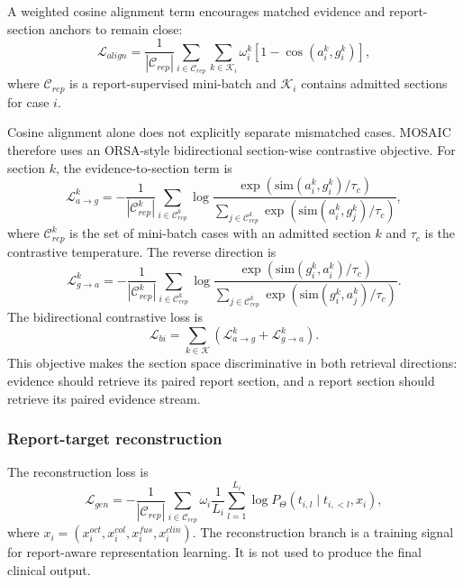 A weighted cosine alignment term encourages matched evidence and report-section anchors to remain close:
\begin{equation}
\mathcal{L}_{align}
=
\frac{1}{|\mathcal{C}_{rep}|}
\sum_{i\in\mathcal{C}_{rep}}
\sum_{k\in\mathcal{K}_i}
\omega_i^k
\left[1-\cos(a_i^k,g_i^k)\right],
\label{eq:mosaic_alignment_loss_final_topcs}
\end{equation}
where $\mathcal{C}_{rep}$ is a report-supervised mini-batch and $\mathcal{K}_i$ contains admitted sections for case $i$.

Cosine alignment alone does not explicitly separate mismatched cases. MOSAIC therefore uses an ORSA-style bidirectional section-wise contrastive objective. For section $k$, the evidence-to-section term is
\begin{equation}
\mathcal{L}_{a\rightarrow g}^{k}
=
-\frac{1}{|\mathcal{C}_{rep}^{k}|}
\sum_{i\in\mathcal{C}_{rep}^{k}}
\log
\frac{
\exp(\mathrm{sim}(a_i^k,g_i^k)/\tau_c)
}{
\sum_{j\in\mathcal{C}_{rep}^{k}}
\exp(\mathrm{sim}(a_i^k,g_j^k)/\tau_c)
},
\label{eq:mosaic_contrastive_ag_final_topcs}
\end{equation}
where $\mathcal{C}_{rep}^{k}$ is the set of mini-batch cases with an admitted section $k$ and $\tau_c$ is the contrastive temperature. The reverse direction is
\begin{equation}
\mathcal{L}_{g\rightarrow a}^{k}
=
-\frac{1}{|\mathcal{C}_{rep}^{k}|}
\sum_{i\in\mathcal{C}_{rep}^{k}}
\log
\frac{
\exp(\mathrm{sim}(g_i^k,a_i^k)/\tau_c)
}{
\sum_{j\in\mathcal{C}_{rep}^{k}}
\exp(\mathrm{sim}(g_i^k,a_j^k)/\tau_c)
}.
\label{eq:mosaic_contrastive_ga_final_topcs}
\end{equation}
The bidirectional contrastive loss is
\begin{equation}
\mathcal{L}_{bi}
=
\sum_{k\in\mathcal{K}}
\left(
\mathcal{L}_{a\rightarrow g}^{k}
+
\mathcal{L}_{g\rightarrow a}^{k}
\right).
\label{eq:mosaic_bidirectional_contrastive_final_topcs}
\end{equation}
This objective makes the section space discriminative in both retrieval directions: evidence should retrieve its paired report section, and a report section should retrieve its paired evidence stream.

\subsubsection{Report-target reconstruction}
\label{subsubsec:generation_loss_final_topcs}

The reconstruction loss is
\begin{equation}
\mathcal{L}_{gen}
=
-\frac{1}{|\mathcal{C}_{rep}|}
\sum_{i\in\mathcal{C}_{rep}}
\omega_i
\frac{1}{L_i}
\sum_{l=1}^{L_i}
\log P_{\Theta}(t_{i,l}\mid t_{i,<l},x_i),
\label{eq:mosaic_generation_loss_final_topcs}
\end{equation}
where $x_i=(x_i^{oct},x_i^{col},x_i^{fus},x_i^{clin})$. The reconstruction branch is a training signal for report-aware representation learning. It is not used to produce the final clinical output.

